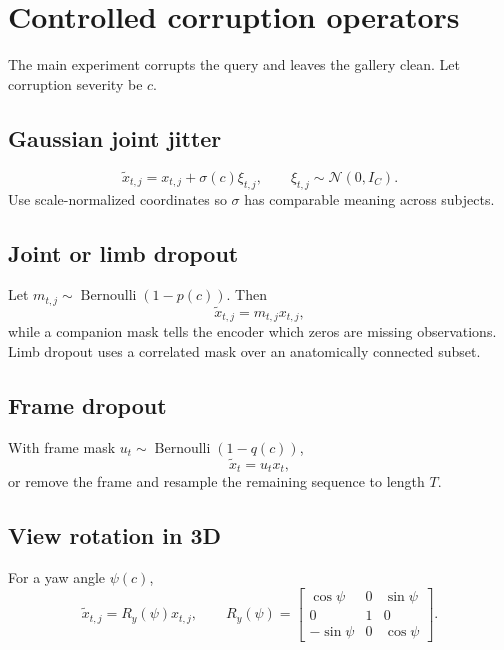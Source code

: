 \documentclass[11pt,oneside,openany]{book}
\theoremstyle{myplain}
\theoremstyle{definition}
\begin{document}
\section{Controlled corruption operators}

The main experiment corrupts the query and leaves the gallery clean. Let corruption severity be $c$.

\subsection{Gaussian joint jitter}
\begin{equation}
  \tilde x_{t,j}=x_{t,j}+\sigma(c)\xi_{t,j},
  \qquad \xi_{t,j}\sim\mathcal N(0,I_C).
  \label{eq:jitter}
\end{equation}
Use scale-normalized coordinates so $\sigma$ has comparable meaning across subjects.

\subsection{Joint or limb dropout}
Let $m_{t,j}\sim\operatorname{Bernoulli}(1-p(c))$. Then
\begin{equation}
  \tilde x_{t,j}=m_{t,j}x_{t,j},
  \label{eq:jointdrop}
\end{equation}
while a companion mask tells the encoder which zeros are missing observations. Limb dropout uses a correlated mask over an anatomically connected subset.

\subsection{Frame dropout}
With frame mask $u_t\sim\operatorname{Bernoulli}(1-q(c))$,
\begin{equation}
  \tilde x_t=u_tx_t,
  \label{eq:framedrop}
\end{equation}
or remove the frame and resample the remaining sequence to length $T$.

\subsection{View rotation in 3D}
For a yaw angle $\psi(c)$,
\begin{equation}
\tilde x_{t,j}=R_y(\psi)x_{t,j},\qquad
R_y(\psi)=
\begin{bmatrix}
\cos\psi&0&\sin\psi\\
0&1&0\\
-\sin\psi&0&\cos\psi
\end{bmatrix}.
\label{eq:rotation}
\end{equation}
\end{document}
